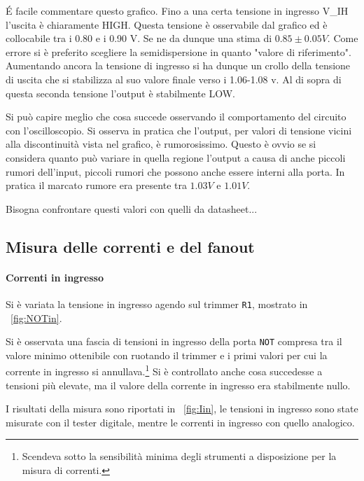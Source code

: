 \documentclass[a4paper,10pt]{article}
\def\code#1{\texttt{#1}}
\begin{document}
\'E facile commentare questo grafico. Fino a una certa tensione in ingresso V_{IH} l'uscita è chiaramente HIGH. Questa tensione è osservabile dal grafico ed è collocabile tra i 0.80 e i 0.90 V. Se ne da dunque una stima di $0.85 \pm 0.05 V$. Come errore si è preferito scegliere la semidispersione in quanto "valore di riferimento". 
Aumentando ancora la tensione di ingresso si ha dunque un crollo della tensione di uscita che si stabilizza al suo valore finale verso i 1.06-1.08 v. Al di sopra di questa seconda tensione l'output è stabilmente LOW.


Si può capire meglio che cosa succede osservando il comportamento del circuito con l'oscilloscopio. Si osserva in pratica che l'output, per valori di tensione vicini alla discontinuità vista nel grafico, è rumorosissimo. Questo è ovvio se si considera quanto può variare in quella regione l'output a causa di anche piccoli rumori dell'input, piccoli rumori che possono anche essere interni alla porta.
In pratica il marcato rumore era presente tra $1.03 V$ e $1.01 V$.


Bisogna confrontare questi valori con quelli da datasheet...
 
\subsection{Misura delle correnti e del fanout}

\paragraph{Correnti in ingresso}

Si è variata la tensione in ingresso agendo sul trimmer \code{R1}, mostrato in \figurename{~\ref{fig:NOTin}}.
	
Si è osservata una fascia di tensioni in ingresso della porta \code{NOT} compresa tra il valore minimo ottenibile con ruotando il trimmer e i primi valori per cui la corrente in ingresso si annullava.\footnote{\label{nota:I0}Scendeva sotto la sensibilità minima degli strumenti a disposizione per la misura di correnti.} Si è controllato anche cosa succedesse a tensioni più elevate, ma il valore della corrente in ingresso era stabilmente nullo.

I risultati della misura sono riportati in \figurename{~\ref{fig:Iin}}, le tensioni in ingresso sono state misurate con il tester digitale, mentre le correnti in ingresso con quello analogico.
\end{document}
